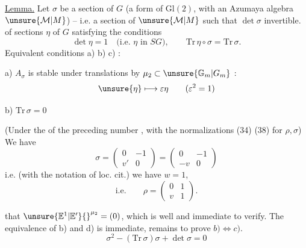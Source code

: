 
\uline{Lemma.} Let $\sigma$ be a section of $G$ (a form of
$\mathrm{Gl}(2)$,  with an Azumaya algebra
$\unsure{\mathcal M|M}$) -- i.e. a section of
$\unsure{\mathcal M|M}$ such that $\det\sigma$ invertible.
of sections $\eta$  of $G$ satisfying the conditions
\[
\det\eta=1\quad\text{(i.e. $\eta$ in $SG$)},\qquad
\mathrm{Tr}\,\eta\circ\sigma=\mathrm{Tr}\,\sigma.
\]
Equivalent conditions a) b) c) :

a) $A_\sigma$ is stable under translations by
$\mu_2\subset\unsure{\mathbb G_m|G_m}$ :
\[
\unsure{\eta}\longmapsto\varepsilon\eta\qquad(\varepsilon^2=1)
\]

b) $\mathrm{Tr}\,\sigma=0$


 (Under the  of the preceding number
,
with the normalizations (34) (38) for $\rho,\sigma$) We have
\[
\tag{6}
\sigma=\begin{pmatrix}0&-1\\v'&0\end{pmatrix}
=\begin{pmatrix}0&-1\\-v&0\end{pmatrix}
\]
i.e. (with the notation of loc. cit.) we have $w=1$,
\[
\tag{7}
\text{i.e.}\qquad
\rho=\begin{pmatrix}0&1\\v&1\end{pmatrix}.
\]



that $\unsure{\mathbb E^1|\mathbb E'}{}^{\mu_2}=(0)$, which is well
 and immediate to verify.
The equivalence of b) and d) is immediate, remains to prove
$b)\Longleftrightarrow c)$.
\[
\sigma^2-(\mathrm{Tr}\,\sigma)\sigma+\det\sigma=0
\]

